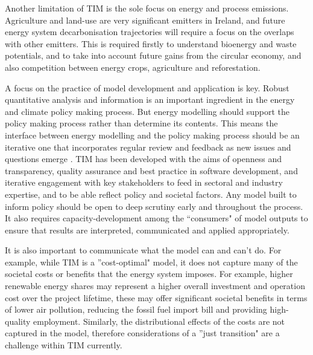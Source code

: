 \documentclass[gmd,manuscript]{copernicus}
\begin{document}
Another limitation of TIM is the sole focus on energy and process emissions. Agriculture and land-use are very significant emitters in Ireland, and future energy system decarbonisation trajectories will require a focus on the overlaps with other emitters. This is required firstly to understand bioenergy and waste potentials, and to take into account future gains from the circular economy, and also competition between energy crops, agriculture and reforestation.

A focus on the practice of model development and application is key. Robust quantitative analysis and information is an important ingredient in the energy and climate policy making process. But energy modelling should support the policy making process rather than determine its contents. This means the interface between energy modelling and the policy making process should be an iterative one that incorporates regular review and feedback as new issues and questions emerge \citep{Strachan2016}. TIM has been developed with the aims of openness and transparency, quality assurance and best practice in software development, and iterative engagement with key stakeholders to feed in sectoral and industry expertise, and to be able reflect policy and societal factors. Any model built to inform policy should be open to deep scrutiny early and throughout the process. It also requires capacity-development among the ``consumers" of model outputs to ensure that results are interpreted, communicated and applied appropriately.

It is also important to communicate what the model can and can't do. For example, while TIM is a ''cost-optimal" model, it does not capture many of the societal costs or benefits that the energy system imposes. For example, higher renewable energy shares may represent a higher overall investment and operation cost over the project lifetime, these may offer significant societal benefits in terms of lower air pollution, reducing the fossil fuel import bill and providing high-quality employment. Similarly, the distributional effects of the costs are not captured in the model, therefore considerations of a ''just transition" are a challenge within TIM currently. 
\end{document}
